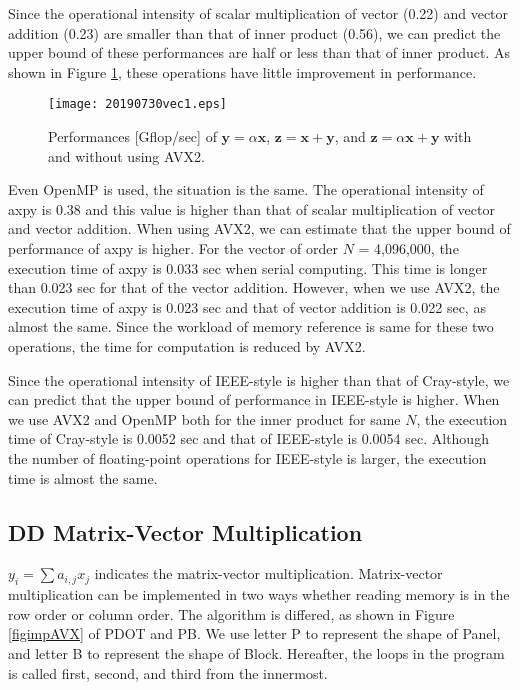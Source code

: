 \documentclass{IOS-Book-Article}
\begin{document}
Since the operational intensity of scalar multiplication of vector (0.22) and vector addition (0.23) are smaller than that of inner product (0.56), we can predict the upper bound of these performances are half or less than that of inner product.
As shown in Figure \ref{xd}, these operations have little improvement in performance. 
\begin{figure}[htbp]
  \begin{center}
    \texttt{[image: 20190730vec1.eps]}
    \caption{Performances [Gflop/sec] of $\bm{y} = \alpha\bm{x}$, $\bm{z} = \bm{x} + \bm{y}$, and $\bm{z} = \alpha\bm{x} + \bm{y}$ with and without using AVX2.}
    \label{xd}
  \end{center}
\end{figure}

Even OpenMP is used, the situation is the same. The operational intensity of axpy is 0.38 and this value is higher than that of scalar multiplication of vector and vector addition. When using AVX2, we can estimate that the upper bound of performance of axpy is higher. For the vector of order $N$ = 4,096,000, the execution time of axpy is 0.033 sec when serial computing. This time is longer than 0.023 sec for that of the vector addition. However, when we use AVX2, the execution time of axpy is 0.023 sec and that of vector addition is 0.022 sec, as almost the same. Since the workload of memory reference is same for these two operations, the time for computation is reduced by AVX2.

Since the operational intensity of IEEE-style is higher than that of Cray-style, we can predict that the upper bound of performance in IEEE-style is higher. When we use AVX2 and OpenMP both for the inner product for same $N$, the execution time of Cray-style is 0.0052 sec and that of IEEE-style is 0.0054 sec. Although the number of floating-point operations for IEEE-style is larger, the execution time is almost the same.

\subsection{DD Matrix-Vector Multiplication}
$y_{i} = \sum a_{i,j}x_{j}$ indicates the matrix-vector multiplication. 
Matrix-vector multiplication can be implemented in two ways whether reading memory is in the row order or column order. The algorithm is differed, as shown in Figure \ref{figimpAVX} of PDOT and PB. We use letter P to represent the shape of Panel, and letter B to represent the shape of Block\cite{goto}. Hereafter, the loops in the program is called first, second, and third from the innermost.
\end{document}
